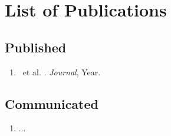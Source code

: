 \section{List of Publications}
\label{sec:pub}

\subsection*{Published}
\begin{enumerate}
	\item \AuthorName\ et al. \DocTitle. \textit{Journal}, Year.
\end{enumerate}

\subsection*{Communicated}
\begin{enumerate}
	\item ...
\end{enumerate}